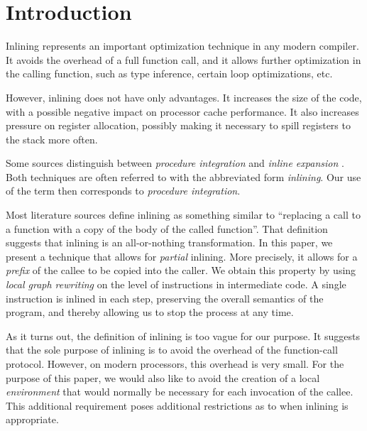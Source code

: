 \section{Introduction}

Inlining represents an important optimization technique in any modern
compiler.  It avoids the overhead of a full function call, and it
allows further optimization in the calling function, such as type
inference, certain loop optimizations, etc.

However, inlining does not have only advantages.  It increases the
size of the code, with a possible negative impact on processor cache
performance.  It also increases pressure on register allocation,
possibly making it necessary to spill registers to the stack more
often.

Some sources distinguish between \emph{procedure integration} and
\emph{inline expansion} \cite{Muchnick:1998:ACD:286076}.  Both
techniques are often referred to with the abbreviated form
\emph{inlining}.  Our use of the term then corresponds to
\emph{procedure integration}.

Most literature sources define inlining as something similar to
``replacing a call to a function with a copy of the body of the called
function''.  That definition suggests that inlining is an
all-or-nothing transformation.  In this paper, we present a technique
that allows for \emph{partial} inlining.  More precisely, it allows
for a \emph{prefix} of the callee to be copied into the caller.  We
obtain this property by using \emph{local graph rewriting} on the
level of instructions in intermediate code.  A single instruction is
inlined in each step, preserving the overall semantics of the program,
and thereby allowing us to stop the process at any time.

As it turns out, the definition of inlining is too vague for our
purpose.  It suggests that the sole purpose of inlining is to avoid
the overhead of the function-call protocol.  However, on modern
processors, this overhead is very small.  For the purpose of this
paper, we would also like to avoid the creation of a local
\emph{environment} that would normally be necessary for each
invocation of the callee.  This additional requirement poses
additional restrictions as to when inlining is appropriate.
